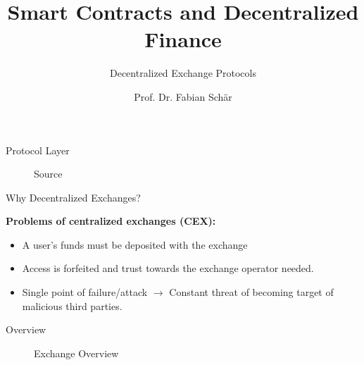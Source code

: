 \documentclass[handout]{beamer}
\title{Smart Contracts and Decentralized Finance}
\subtitle{Decentralized Exchange Protocols}
\author{Prof. Dr. Fabian Schär}
\institute{University of Basel}
\begin{document}
\thispagestyle{empty}
\begin{frame}[noframenumbering]
	\titlepage
\end{frame}


\begin{frame}{Protocol Layer}
\begin{figure}
	\centering
	\resizebox{0.8\textwidth}{!}{
	\begin{tikzpicture}[scale=1.0, every node/.style={scale=1.0}]
		
	\end{tikzpicture}}	
	\caption{Source \cite{FS:21}}
\end{figure}
\end{frame}



\begin{frame}{Why Decentralized Exchanges?}

	\textbf{Problems of centralized exchanges (CEX):}
		\begin{small}
		\begin{itemize}
			\item A user's funds must be deposited with the exchange
			\item Access is forfeited and trust towards the exchange operator needed.
			\item Single point of failure/attack $\rightarrow$ Constant threat of becoming target of malicious third parties.
		\end{itemize}
		\end{small}	

\vspace{1.5em}

\end{frame}

\begin{frame}{Overview}
	\begin{figure}[h!]
		
		\caption*{Exchange Overview \cite{FS:21}}
	\end{figure}
\end{frame}	
\end{document}
